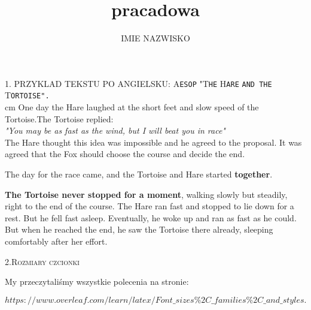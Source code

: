 \documentclass[10pt,a4paper]{article}
\title{pracadowa}
\author {IMIE NAZWISKO}
\begin{document}
\maketitle
\noindent
\raggedright
\textsc {\scriptsize 1. PRZYKLAD TEKSTU PO ANGIELSKU: A\texttt{ESOP} "T\texttt{HE} H\texttt{ARE} \texttt{AND THE} T\texttt{ORTOISE".}}
\\ [0.2cm]
 cm
\small One day the Hare laughed at the short feet and slow speed of the Tortoise.The Tortoise replied:
\\
\textit {"You may be as fast as the wind, but I will beat you in race"}
\\

\small The Hare thought this idea was impossible and he agreed to the proposal. It 
was agreed that the Fox should choose the course and decide the end.

\small The day for the race came, and the Tortoise and Hare started \textbf{together}.

\small \textbf{The Tortoise never stopped for a moment}, walking slowly but steadily, right to the end of the course. The Hare ran fast and stopped to lie down for a rest. But he fell fast asleep. Eventually, he woke up and ran as fast as he could. But when he reached the end, he saw the Tortoise there already, sleeping comfortably after her effort.
\\
\begin{center}
\textsc { \normalsize  2.Rozmiary czcionki}
\end{center}

\small My przeczytaliśmy wszystkie polecenia na stronie:
\\
\begin{flushleft}
\small {$https://www.overleaf.com/learn/latex/Font\_sizes\%2C\_families\%2C\_and\_styles.$}
\end{flushleft}
\end{document}
